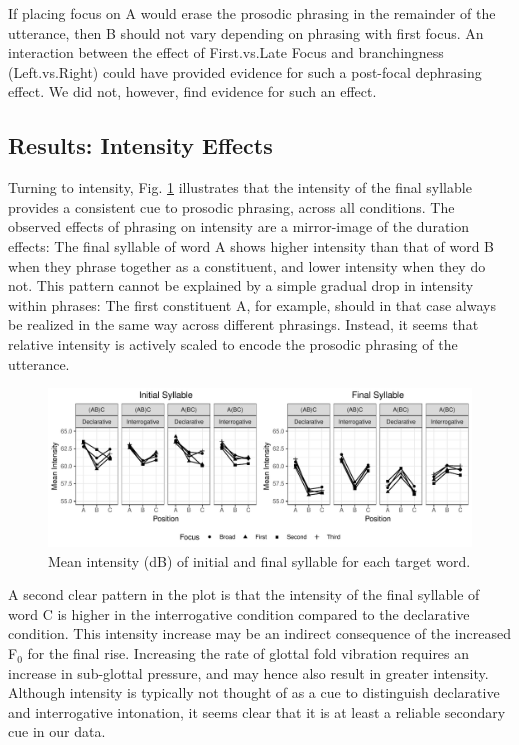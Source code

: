 \documentclass[preprint,review,12pt,authoryear,times]{elsarticle}
\begin{document}
If placing focus on A would erase the prosodic phrasing in the remainder of the utterance, then B should not vary depending on phrasing with first focus. An interaction between the effect of First.vs.Late Focus and branchingness (Left.vs.Right) could have provided evidence for such a post-focal dephrasing effect. We did not, however, find evidence for such an effect. 


\subsection{Results: Intensity Effects}

Turning to intensity, Fig. \ref{figureIntensity} illustrates that the intensity of the final syllable provides a consistent cue to prosodic phrasing, across all conditions.  The observed effects of phrasing on intensity are a mirror-image of the duration effects: The final syllable of word A shows higher intensity than that of word B when they phrase together as a constituent, and lower intensity when they do not. This pattern cannot be explained by a simple gradual drop in intensity within phrases: The first constituent A, for example, should in that case always be realized in the same way across different phrasings. Instead, it seems that relative intensity is actively scaled to encode the prosodic phrasing of the utterance. 

\begin{figure}[ht!]
	\begin{center}
		\includegraphics[width=5.4in]{Figures/Mean_Intensity.pdf}
		\caption{Mean intensity (dB) of initial and final syllable for each target word.}
		\label{figureIntensity}
	\end{center}
\end{figure}

A second clear pattern in the plot is that the intensity of the final syllable of word C is higher in the interrogative condition compared to the declarative condition. This intensity increase may be an indirect consequence of the increased F$_0$ for the final rise. Increasing the rate of glottal fold vibration requires an increase in sub-glottal pressure, and may hence also result in greater intensity. Although intensity is typically not thought of as a cue to distinguish declarative and interrogative intonation, it seems clear that it is at least a reliable secondary cue in our data. 
\end{document}

